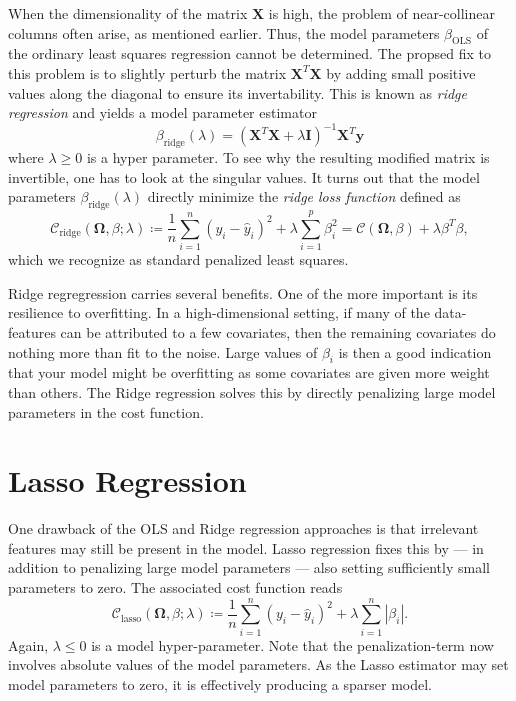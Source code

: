 \documentclass[dvipsnames, article, a4paper, oneside, 12pt]{memoir}
\newcommand{\X}{\bm{X}}
\newcommand{\OLS}{\mathrm{OLS}}
\newcommand{\ridge}{\mathrm{ridge}}
\newcommand{\lasso}{\mathrm{lasso}}
\newcommand{\mat}[1]{\bm{#1}}
\newcommand{\y}{\bm{y}}
\newcommand{\data}{\bm{\Omega}}
\newcommand{\cost}{\mathcal{C}}
\begin{document}
  When the dimensionality of the matrix \( \X \) is high, the problem of
  near-collinear columns often arise, as mentioned earlier. Thus, the model
  parameters \( \beta_{\OLS} \) of the ordinary least squares regression cannot
  be determined. The propsed fix to this problem is to slightly perturb the
  matrix \( \X^T \X \) by adding small positive values along the diagonal to
  ensure its invertability. This is known as \emph{ridge regression} and yields
  a model parameter estimator
  \begin{equation}
    \beta_{\ridge}(\lambda) = (\X^T\X + \lambda\mat{I})^{-1}\X^T\y
  \end{equation}
  where \( \lambda \geq 0 \) is a hyper parameter. To see why the resulting
  modified matrix is invertible, one has to look at the singular values.  It
  turns out that the model parameters \( \beta_{\ridge}(\lambda) \) directly
  minimize the \emph{ridge loss function} defined as
  \begin{equation}
    \cost_{\ridge}(\data, \beta;  \lambda) \coloneqq \frac{1}{n} \sum_{i=1}^n (y_i - \hat{y}_i)^2 + \lambda \sum_{i=1}^p \beta_i^2 = \cost(\data, \beta) + \lambda \beta^T \beta,
  \end{equation}
  which we recognize as standard penalized least squares.
  
  Ridge regregression carries several benefits. One of the more important is
  its resilience to overfitting. In a high-dimensional setting, if many of the
  data-features can be attributed to a few covariates, then the remaining
  covariates do nothing more than fit to the noise. Large values of \( \beta_i
  \) is then a good indication that your model might be overfitting as some
  covariates are given more weight than others.  The Ridge regression solves
  this by directly penalizing large model parameters in the cost function. 
  
  \section{Lasso Regression}

  One drawback of the OLS and Ridge regression approaches is that irrelevant
  features may still be present in the model. Lasso regression fixes this by
  --- in addition to penalizing large model parameters --- also setting
  sufficiently small parameters to zero. The associated cost function reads
  \begin{equation}
    \cost_{\lasso}(\data, \beta; \lambda) \coloneqq \frac{1}{n} \sum_{i=1}^n (y_i - \hat{y}_i)^2 + \lambda \sum_{i=1}^n |\beta_i|.
  \end{equation}
  Again, \( \lambda \leq 0 \) is a model hyper-parameter. Note that the
  penalization-term now involves absolute values of the model parameters. As
  the Lasso estimator may set model parameters to zero, it is effectively
  producing a sparser model. 
  
\end{document}
